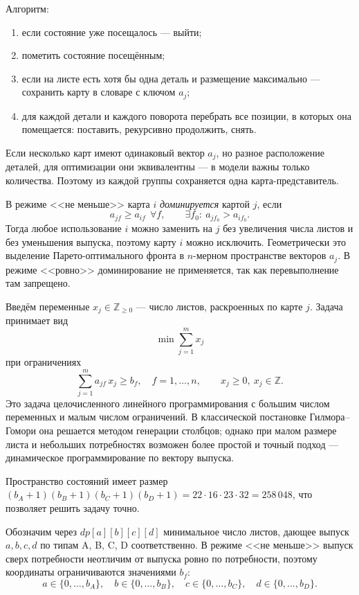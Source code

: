 Алгоритм:
\begin{enumerate}
    \item если состояние уже посещалось — выйти;
    \item пометить состояние посещённым;
    \item если на листе есть хотя бы одна деталь и размещение
          максимально — сохранить карту в словаре с ключом $a_j$;
    \item для каждой детали и каждого поворота перебрать все позиции,
          в которых она помещается: поставить, рекурсивно продолжить,
          снять.
\end{enumerate}

Если несколько карт имеют одинаковый вектор $a_j$, но разное
расположение деталей, для оптимизации они эквивалентны — в модели
важны только количества. Поэтому из каждой группы сохраняется одна
карта-представитель.


В режиме <<не меньше>> карта $i$ \emph{доминируется} картой $j$, если
\[
a_{jf} \ge a_{if} \ \ \forall f, \qquad \exists f_0:\ a_{j f_0} > a_{i f_0}.
\]
Тогда любое использование $i$ можно заменить на $j$ без увеличения
числа листов и без уменьшения выпуска, поэтому карту $i$ можно
исключить. Геометрически это выделение Парето-оптимального фронта в
$n$-мерном пространстве векторов $a_j$. В режиме <<ровно>>
доминирование не применяется, так как перевыполнение там запрещено.

\clearpage

Введём переменные $x_j \in \mathbb{Z}_{\ge 0}$ — число листов,
раскроенных по карте $j$. Задача принимает вид
\[
\min \sum_{j=1}^{m} x_j
\]
при ограничениях
\[
\sum_{j=1}^{m} a_{jf} \, x_j \ge b_f, \quad f = 1, \ldots, n,
\qquad x_j \ge 0,\ x_j \in \mathbb{Z}.
\]
Это задача целочисленного линейного программирования с большим числом
переменных и малым числом ограничений. В классической постановке
Гилмора--Гомори она решается методом генерации столбцов; однако при
малом размере листа и небольших потребностях возможен более простой и
точный подход — динамическое программирование по вектору выпуска.


Пространство состояний имеет размер
$(b_A+1)(b_B+1)(b_C+1)(b_D+1) = 22 \cdot 16 \cdot 23 \cdot 32 = 258\,048$,
что позволяет решить задачу точно.

Обозначим через $dp[a][b][c][d]$ минимальное число листов, дающее
выпуск $a, b, c, d$ по типам A, B, C, D соответственно. В режиме
<<не меньше>> выпуск сверх потребности неотличим от выпуска ровно по
потребности, поэтому координаты ограничиваются значениями $b_f$:
\[
a \in \{0,\ldots,b_A\},\quad b \in \{0,\ldots,b_B\},\quad
c \in \{0,\ldots,b_C\},\quad d \in \{0,\ldots,b_D\}.
\]

